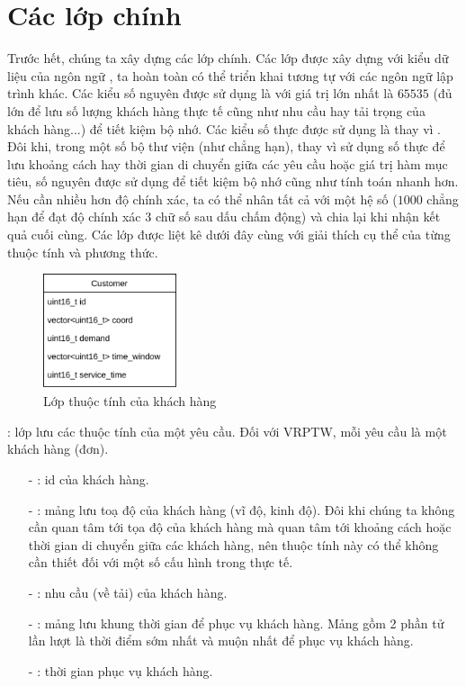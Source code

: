 \section{Các lớp chính}
\label{sec:core-objects}
Trước hết, chúng ta xây dựng các lớp chính. Các lớp được xây dựng với kiểu dữ liệu của ngôn ngữ , ta hoàn toàn có thể triển khai tương tự với các ngôn ngữ lập trình khác. Các kiểu số nguyên được sử dụng là  với giá trị lớn nhất là $65535$ (đủ lớn để lưu số lượng khách hàng thực tế cũng như nhu cầu hay tải trọng của khách hàng...) để tiết kiệm bộ nhớ. Các kiểu số thực được sử dụng là  thay vì . Đôi khi, trong một số bộ thư viện (như  chẳng hạn), thay vì sử dụng số thực để lưu khoảng cách hay thời gian di chuyển giữa các yêu cầu hoặc giá trị hàm mục tiêu, số nguyên được sử dụng để tiết kiệm bộ nhớ cũng như tính toán nhanh hơn. Nếu cần nhiều hơn độ chính xác, ta có thể nhân tất cả với một hệ số ($1000$ chẳng hạn để đạt độ chính xác $3$ chữ số sau dấu chấm động) và chia lại khi nhận kết quả cuối cùng. Các lớp được liệt kê dưới đây cùng với giải thích cụ thể của từng thuộc tính và phương thức.

\begin{figure}[H] %
	\centering %
	\includegraphics[width=0.35\textwidth]{figures/Customer.png}
	\caption{Lớp thuộc tính của khách hàng}
	\label{fig:fg_02}
\end{figure}

: lớp lưu các thuộc tính của một yêu cầu. Đối với VRPTW, mỗi yêu cầu là một khách hàng (đơn).

\begin{itemize}
	\item[-] : id của khách hàng.
	\item[-] : mảng lưu toạ độ của khách hàng (vĩ độ, kinh độ). Đôi khi chúng ta không cần quan tâm tới tọa độ của khách hàng mà quan tâm tới khoảng cách hoặc thời gian di chuyển giữa các khách hàng, nên thuộc tính này có thể không cần thiết đối với một số cấu hình trong thực tế.
	\item[-] : nhu cầu (về tải) của khách hàng.
	\item[-] : mảng lưu khung thời gian để phục vụ khách hàng. Mảng gồm 2 phần tử lần lượt là thời điểm sớm nhất và muộn nhất để phục vụ khách hàng.
	\item[-] : thời gian phục vụ khách hàng.
\end{itemize}

